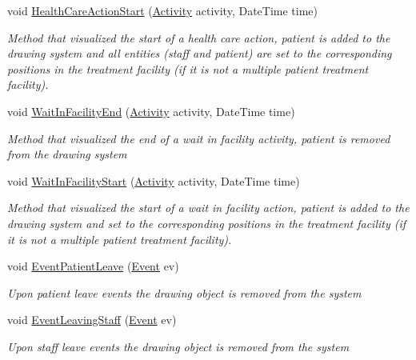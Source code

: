 \begin{DoxyCompactItemize}
void \hyperlink{class_sample_hospital_model_1_1_visualization_1_1_w_p_f_visualization_engine_health_care_department_control_unit_a3394a6e0359fa0246fff89c9313965d4}{Health\+Care\+Action\+Start} (\hyperlink{class_simulation_core_1_1_h_c_c_m_elements_1_1_activity}{Activity} activity, Date\+Time time)
\begin{DoxyCompactList}\small\item\em Method that visualized the start of a health care action, patient is added to the drawing system and all entities (staff and patient) are set to the corresponding positions in the treatment facility (if it is not a multiple patient treatment facility). \end{DoxyCompactList}\item 
void \hyperlink{class_sample_hospital_model_1_1_visualization_1_1_w_p_f_visualization_engine_health_care_department_control_unit_adfff669d5726f33626b88c1a72b8ab96}{Wait\+In\+Facility\+End} (\hyperlink{class_simulation_core_1_1_h_c_c_m_elements_1_1_activity}{Activity} activity, Date\+Time time)
\begin{DoxyCompactList}\small\item\em Method that visualized the end of a wait in facility activity, patient is removed from the drawing system \end{DoxyCompactList}\item 
void \hyperlink{class_sample_hospital_model_1_1_visualization_1_1_w_p_f_visualization_engine_health_care_department_control_unit_ad09159950ba3f4c77bda340214bcce44}{Wait\+In\+Facility\+Start} (\hyperlink{class_simulation_core_1_1_h_c_c_m_elements_1_1_activity}{Activity} activity, Date\+Time time)
\begin{DoxyCompactList}\small\item\em Method that visualized the start of a wait in facility action, patient is added to the drawing system and set to the corresponding positions in the treatment facility (if it is not a multiple patient treatment facility). \end{DoxyCompactList}\item 
void \hyperlink{class_sample_hospital_model_1_1_visualization_1_1_w_p_f_visualization_engine_health_care_department_control_unit_ae7b7553c4abb3871ccadbd93a336cf69}{Event\+Patient\+Leave} (\hyperlink{class_simulation_core_1_1_h_c_c_m_elements_1_1_event}{Event} ev)
\begin{DoxyCompactList}\small\item\em Upon patient leave events the drawing object is removed from the system \end{DoxyCompactList}\item 
void \hyperlink{class_sample_hospital_model_1_1_visualization_1_1_w_p_f_visualization_engine_health_care_department_control_unit_a64759dc8379a68dd03c80d7fde9b2b71}{Event\+Leaving\+Staff} (\hyperlink{class_simulation_core_1_1_h_c_c_m_elements_1_1_event}{Event} ev)
\begin{DoxyCompactList}\small\item\em Upon staff leave events the drawing object is removed from the system \end{DoxyCompactList}\end{DoxyCompactItemize}
